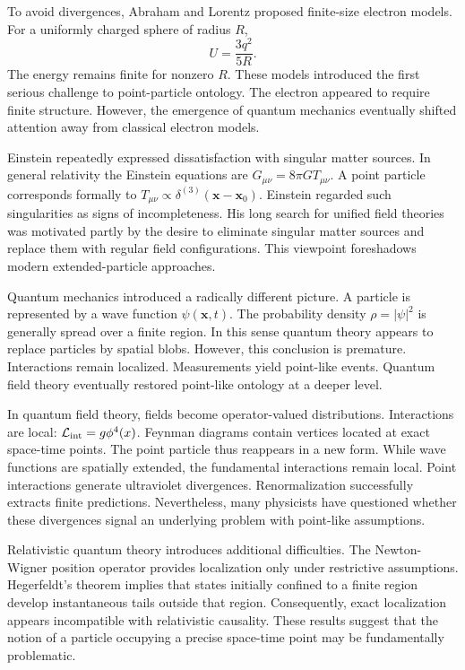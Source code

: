 To avoid divergences, Abraham and Lorentz proposed finite-size electron models.
For a uniformly charged sphere of radius $R$,
\[
U=\frac{3q^2}{5 R}.
\]
The energy remains finite for nonzero $R$.
These models introduced the first serious challenge to point-particle ontology.
The electron appeared to require finite structure.
However, the emergence of quantum mechanics eventually shifted attention 
away from classical electron models.

Einstein repeatedly expressed dissatisfaction with singular matter sources.
In general relativity the Einstein equations are
$G_{\mu\nu}=8\pi G T_{\mu\nu}$.
A point particle corresponds formally to
$T_{\mu\nu}\propto \delta^{(3)}(\mathbf{x}-\mathbf{x}_0)$.
Einstein regarded such singularities as signs of incompleteness.
His long search for unified field theories was motivated partly by the 
desire to eliminate singular matter sources and replace them with regular
field configurations.
This viewpoint foreshadows modern extended-particle approaches.

Quantum mechanics introduced a radically different picture.
A particle is represented by a wave function
$\psi(\mathbf{x},t)$. The probability density $\rho=|\psi|^2$
is generally spread over a finite region.
In this sense quantum theory appears to replace particles by spatial blobs.
However, this conclusion is premature.
Interactions remain localized.
Measurements yield point-like events.
Quantum field theory eventually restored point-like ontology at a deeper level.

In quantum field theory, fields become operator-valued distributions.
Interactions are local: $\mathcal{L}_{\rm int}=g\phi^4(x)$.
Feynman diagrams contain vertices located at exact space-time points.
The point particle thus reappears in a new form.
While wave functions are spatially extended, the fundamental interactions
remain local.
Point interactions generate ultraviolet divergences.
Renormalization successfully extracts finite predictions.
Nevertheless, many physicists have questioned whether these divergences 
signal an underlying problem with point-like assumptions.

Relativistic quantum theory introduces additional difficulties.
The Newton-Wigner position operator provides localization only under 
restrictive assumptions.
Hegerfeldt's theorem implies that states initially confined to a finite 
region develop instantaneous tails outside that region.
Consequently, exact localization appears incompatible with relativistic causality.
These results suggest that the notion of a particle occupying a precise space-time
point may be fundamentally problematic.

